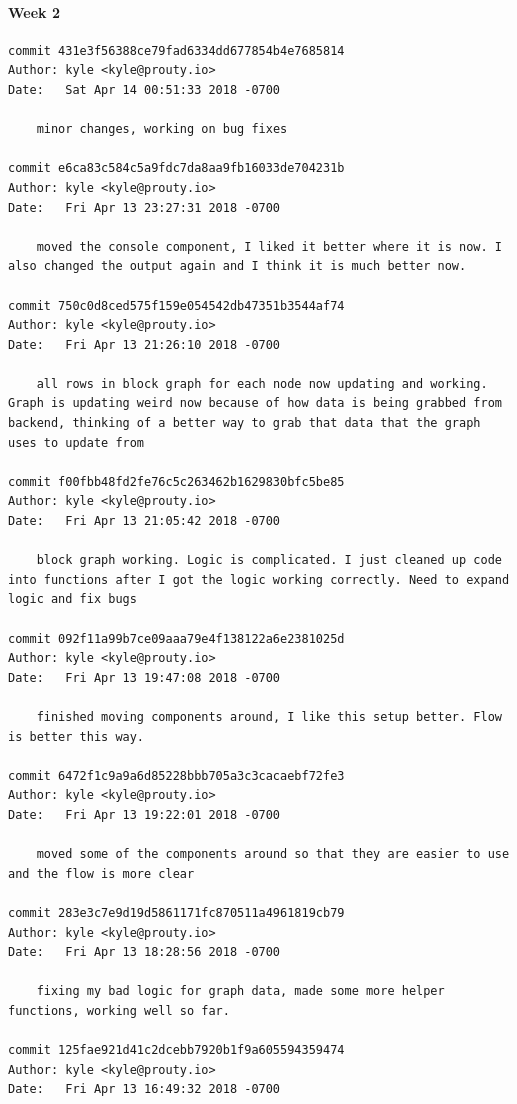 \documentclass[draftclsnofoot, onecolumn, compsoc, 10pt]{IEEEtran}
\begin{document}
\paragraph{Week 2}
\begin{lstlisting}
commit 431e3f56388ce79fad6334dd677854b4e7685814 
Author: kyle <kyle@prouty.io> 
Date:   Sat Apr 14 00:51:33 2018 -0700 

    minor changes, working on bug fixes 

commit e6ca83c584c5a9fdc7da8aa9fb16033de704231b 
Author: kyle <kyle@prouty.io> 
Date:   Fri Apr 13 23:27:31 2018 -0700 

    moved the console component, I liked it better where it is now. I also changed the output again and I think it is much better now. 

commit 750c0d8ced575f159e054542db47351b3544af74 
Author: kyle <kyle@prouty.io> 
Date:   Fri Apr 13 21:26:10 2018 -0700 

    all rows in block graph for each node now updating and working. Graph is updating weird now because of how data is being grabbed from backend, thinking of a better way to grab that data that the graph uses to update from 

commit f00fbb48fd2fe76c5c263462b1629830bfc5be85 
Author: kyle <kyle@prouty.io> 
Date:   Fri Apr 13 21:05:42 2018 -0700 

    block graph working. Logic is complicated. I just cleaned up code into functions after I got the logic working correctly. Need to expand logic and fix bugs 

commit 092f11a99b7ce09aaa79e4f138122a6e2381025d 
Author: kyle <kyle@prouty.io> 
Date:   Fri Apr 13 19:47:08 2018 -0700 

    finished moving components around, I like this setup better. Flow is better this way. 

commit 6472f1c9a9a6d85228bbb705a3c3cacaebf72fe3 
Author: kyle <kyle@prouty.io> 
Date:   Fri Apr 13 19:22:01 2018 -0700 

    moved some of the components around so that they are easier to use and the flow is more clear 
 
commit 283e3c7e9d19d5861171fc870511a4961819cb79 
Author: kyle <kyle@prouty.io> 
Date:   Fri Apr 13 18:28:56 2018 -0700 

    fixing my bad logic for graph data, made some more helper functions, working well so far. 

commit 125fae921d41c2dcebb7920b1f9a605594359474 
Author: kyle <kyle@prouty.io> 
Date:   Fri Apr 13 16:49:32 2018 -0700 


\end{lstlisting}
\end{document}

